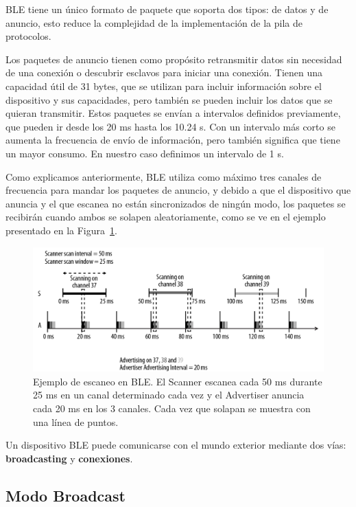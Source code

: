 BLE tiene un único formato de paquete que soporta dos tipos: de datos y de anuncio, esto reduce la complejidad de la implementación de la pila de protocolos.

Los paquetes de anuncio tienen como propósito retransmitir datos sin necesidad de una conexión o descubrir esclavos para iniciar una conexión.  Tienen una capacidad útil de 31 bytes, que se utilizan para incluir información sobre el dispositivo y sus capacidades, pero también se pueden incluir los datos que se quieran transmitir. Estos paquetes se envían a intervalos definidos previamente, que pueden ir desde los 20 ms hasta los 10.24 s. Con un intervalo más corto se aumenta la frecuencia de envío de información, pero también significa que tiene un mayor consumo. En nuestro caso definimos un intervalo de 1 s.

Como explicamos anteriormente, BLE utiliza como máximo tres canales de frecuencia para mandar los paquetes de anuncio, y debido a que el dispositivo que anuncia y el que escanea no están sincronizados de ningún modo, los paquetes se recibirán cuando ambos se solapen aleatoriamente, como se ve en el ejemplo presentado en la Figura~\ref{figuraBLEScan}.

\begin{figure}[h]%
	\centering
    \includegraphics[width=\linewidth]{figures/ble_scan_example.png} %
    \caption[Ejemplo de escaneo BLE]{Ejemplo de escaneo en BLE. El Scanner escanea cada 50 ms durante 25 ms en un canal determinado cada vez y el Advertiser anuncia cada 20 ms en los 3 canales. Cada vez que solapan se muestra con una línea de puntos.}
   	\label{figuraBLEScan}
\end{figure}

Un dispositivo BLE puede comunicarse con el mundo exterior mediante dos vías: \textbf{broadcasting} y \textbf{conexiones}.

\subsection{Modo Broadcast}
\label{makereference2.3.1}

